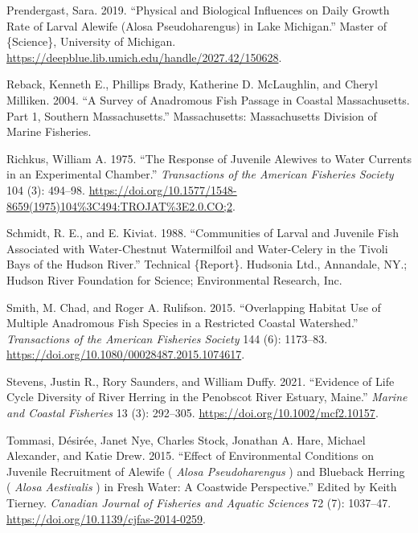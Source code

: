 \documentclass[
]{book}
\newlength{\cslhangindent}
\newlength{\cslentryspacingunit} %
\newenvironment{CSLReferences}[2] %
 {%
  \setlength{\parindent}{0pt}
  \ifodd #1
  \let\oldpar\par
  \def\par{\hangindent=\cslhangindent\oldpar}
  \fi
  \setlength{\parskip}{#2\cslentryspacingunit}
 }%
 {}
\begin{document}
\begin{CSLReferences}{1}{0}
\leavevmode{}%
Prendergast, Sara. 2019. {``Physical and Biological Influences on Daily Growth Rate of Larval Alewife ({Alosa} Pseudoharengus) in {Lake} {Michigan}.''} Master of \{Science\}, University of Michigan. \url{https://deepblue.lib.umich.edu/handle/2027.42/150628}.

\leavevmode{}%
Reback, Kenneth E., Phillips Brady, Katherine D. McLaughlin, and Cheryl Milliken. 2004. {``A {Survey} of {Anadromous} {Fish} {Passage} in {Coastal} {Massachusetts}. {Part} 1, {Southern} {Massachusetts}.''} Massachusetts: Massachusetts Division of Marine Fisheries.

\leavevmode{}%
Richkus, William A. 1975. {``The {Response} of {Juvenile} {Alewives} to {Water} {Currents} in an {Experimental} {Chamber}.''} \emph{Transactions of the American Fisheries Society} 104 (3): 494--98. \url{https://doi.org/10.1577/1548-8659(1975)104\%3C494:TROJAT\%3E2.0.CO;2}.

\leavevmode{}%
Schmidt, R. E., and E. Kiviat. 1988. {``Communities of {Larval} and {Juvenile} {Fish} {Associated} with {Water}-{Chestnut} {Watermilfoil} and {Water}-{Celery} in the {Tivoli} {Bays} of the {Hudson} {River}.''} Technical \{Report\}. Hudsonia Ltd., Annandale, NY.; Hudson River Foundation for Science; Environmental Research, Inc.

\leavevmode{}%
Smith, M. Chad, and Roger A. Rulifson. 2015. {``Overlapping {Habitat} {Use} of {Multiple} {Anadromous} {Fish} {Species} in a {Restricted} {Coastal} {Watershed}.''} \emph{Transactions of the American Fisheries Society} 144 (6): 1173--83. \url{https://doi.org/10.1080/00028487.2015.1074617}.

\leavevmode{}%
Stevens, Justin R., Rory Saunders, and William Duffy. 2021. {``Evidence of {Life} {Cycle} {Diversity} of {River} {Herring} in the {Penobscot} {River} {Estuary}, {Maine}.''} \emph{Marine and Coastal Fisheries} 13 (3): 292--305. \url{https://doi.org/10.1002/mcf2.10157}.

\leavevmode{}%
Tommasi, Désirée, Janet Nye, Charles Stock, Jonathan A. Hare, Michael Alexander, and Katie Drew. 2015. {``Effect of Environmental Conditions on Juvenile Recruitment of Alewife ( \emph{{Alosa} Pseudoharengus} ) and Blueback Herring ( \emph{{Alosa} Aestivalis} ) in Fresh Water: A Coastwide Perspective.''} Edited by Keith Tierney. \emph{Canadian Journal of Fisheries and Aquatic Sciences} 72 (7): 1037--47. \url{https://doi.org/10.1139/cjfas-2014-0259}.


\end{CSLReferences}
\end{document}
